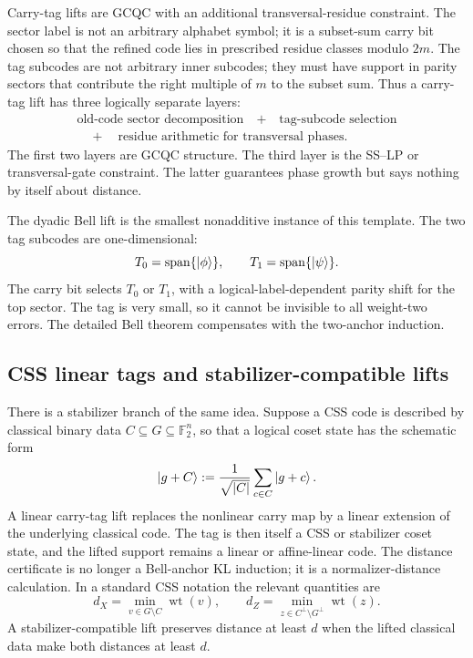 \documentclass[11pt]{article}
\newcommand{\F}{\mathbb F}
\newcommand{\wt}{\operatorname{wt}}
\newcommand{\Span}{\operatorname{span}}
\newcommand{\ketphi}{\ket{\phi}}
\newcommand{\ketpsi}{\ket{\psi}}
\begin{document}
Carry-tag lifts are GCQC with an additional transversal-residue constraint.  The sector label is
not an arbitrary alphabet symbol; it is a subset-sum carry bit chosen so that the refined code lies
in prescribed residue classes modulo $2m$.  The tag subcodes are not arbitrary inner subcodes; they
must have support in parity sectors that contribute the right multiple of $m$ to the subset sum.
Thus a carry-tag lift has three logically separate layers:
\begin{equation}
\begin{gathered}
  \text{old-code sector decomposition}
  \quad+\quad
  \text{tag-subcode selection}\\
  \quad+\quad
  \text{residue arithmetic for transversal phases}.
\end{gathered}
  \label{eq:three-layers}
\end{equation}
The first two layers are GCQC structure.  The third layer is the SS--LP or transversal-gate
constraint.  The latter guarantees phase growth but says nothing by itself about distance.

The dyadic Bell lift is the smallest nonadditive instance of this template.  The two tag subcodes
are one-dimensional:
\begin{equation}
  T_0=\Span\{\ketphi\},
  \qquad
  T_1=\Span\{\ketpsi\}.
  \label{eq:bell-tag-subcodes}
\end{equation}
The carry bit selects $T_0$ or $T_1$, with a logical-label-dependent parity shift for the top
sector.  The tag is very small, so it cannot be invisible to all weight-two errors.  The detailed
Bell theorem compensates with the two-anchor induction.

\subsection{CSS linear tags and stabilizer-compatible lifts}

There is a stabilizer branch of the same idea.  Suppose a CSS code is described by classical
binary data $C\subseteq G\subseteq\F_2^n$, so that a logical coset state has the schematic form
\begin{equation}
  \ket{g+C}:=\frac{1}{\sqrt{|C|}}\sum_{c\in C}\ket{g+c}.
  \label{eq:css-coset-state}
\end{equation}
A linear carry-tag lift replaces the nonlinear carry map by a linear extension of the underlying
classical code.  The tag is then itself a CSS or stabilizer coset state, and the lifted support
remains a linear or affine-linear code.  The distance certificate is no longer a Bell-anchor KL
induction; it is a normalizer-distance calculation.  In a standard CSS notation the relevant
quantities are
\begin{equation}
  d_X=\min_{v\in G\setminus C}\wt(v),
  \qquad
  d_Z=\min_{z\in C^\perp\setminus G^\perp}\wt(z).
  \label{eq:css-distances}
\end{equation}
A stabilizer-compatible lift preserves distance at least $d$ when the lifted classical data make
both distances at least $d$.
\end{document}
